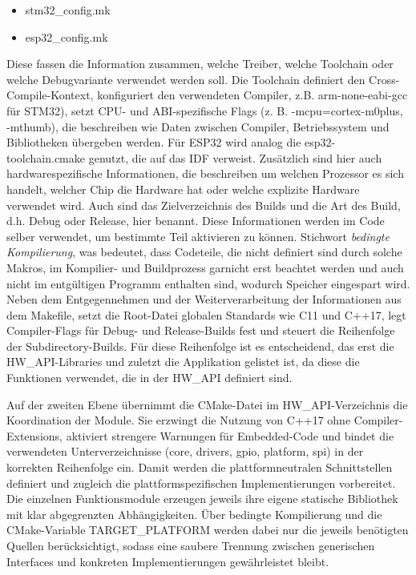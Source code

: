 \begin{itemize}
	\item stm32\_config.mk
	\item esp32\_config.mk
\end{itemize}

Diese fassen die Information zusammen, welche Treiber, welche Toolchain oder welche Debugvariante verwendet werden soll.
Die Toolchain definiert den Cross-Compile-Kontext, konfiguriert den verwendeten Compiler, z.B. arm-none-eabi-gcc für STM32), setzt CPU- und ABI-spezifische Flags (z. B. -mcpu=cortex-m0plus, -mthumb), die beschreiben wie Daten zwischen Compiler, Betriebssystem und Bibliotheken übergeben werden.
Für ESP32 wird analog die esp32-toolchain.cmake genutzt, die auf das IDF verweist.
Zusätzlich sind hier auch hardwarespezifische Informationen, die beschreiben um welchen Prozessor es sich handelt, welcher Chip die Hardware hat oder welche explizite Hardware verwendet wird.
Auch sind das Zielverzeichnis des Builds und die Art des Build, d.h. Debug oder Release, hier benannt.
Diese Informationen werden im Code selber verwendet, um bestimmte Teil aktivieren zu können.
Stichwort \textit{bedingte Kompilierung}, was bedeutet, dass Codeteile, die nicht definiert sind durch solche Makros, im Kompilier- und Buildprozess garnicht erst beachtet werden und auch nicht im entgültigen Programm enthalten sind, wodurch Speicher eingespart wird.
Neben dem Entgegennehmen und der Weiterverarbeitung der Informationen aus dem Makefile, setzt die Root-Datei globalen Standards wie C11 und C++17, legt Compiler-Flags für Debug- und Release-Builds fest und steuert die Reihenfolge der Subdirectory-Builds.
Für diese Reihenfolge ist es entscheidend, das erst die HW\_API-Libraries und zuletzt die Applikation gelistet ist, da diese die Funktionen verwendet, die in der HW\_API definiert sind.

Auf der zweiten Ebene übernimmt die CMake-Datei im HW\_API-Verzeichnis die Koordination der Module. 
Sie erzwingt die Nutzung von C++17 ohne Compiler-Extensions, aktiviert strengere Warnungen für Embedded-Code und bindet die verwendeten Unterverzeichnisse (core, drivers, gpio, platform, spi) in der korrekten Reihenfolge ein.
Damit werden die plattformneutralen Schnittstellen definiert und zugleich die plattformspezifischen Implementierungen vorbereitet. 
Die einzelnen Funktionsmodule erzeugen jeweils ihre eigene statische Bibliothek mit klar abgegrenzten Abhängigkeiten. 
Über bedingte Kompilierung und die CMake-Variable TARGET\_PLATFORM werden dabei nur die jeweils benötigten Quellen berücksichtigt, sodass eine saubere Trennung zwischen generischen Interfaces und konkreten Implementierungen gewährleistet bleibt.


